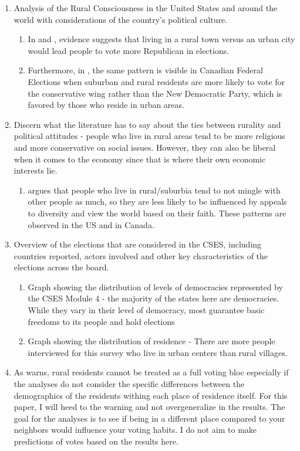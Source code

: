 \documentclass[12pt]{article}
\begin{document}
\begin{enumerate}
\begin{enumerate}
	\item Analysis of the Rural Consciousness in the United States and around the world with considerations of the country's political culture.
	\begin{enumerate}
		\item In \cite{walsh_putting_2012} and \cite{gimpel_rural_2006}, evidence suggests that living in a rural town versus an urban city would lead people to vote more Republican in elections.
		\item Furthermore, in \cite{walks_city-suburban_2005}, the same pattern is visible in Canadian Federal Elections when suburban and rural residents are more likely to vote for the conservative wing rather than the New Democratic Party, which is favored by those who reside in urban areas.
	\end{enumerate}
	\item Discern what the literature has to say about the ties between rurality and political attitudes - people who live in rural areas tend to be more religious and more conservative on social issues. However, they can also be liberal when it comes to the economy since that is where their own economic interests lie.
	\begin{enumerate}
		\item \cite{williamson_sprawl_2008} argues that people who live in rural/suburbia tend to not mingle with other people as much, so they are less likely to be influenced by appeals to diversity and view the world based on their faith. These patterns are observed in the US and in Canada.
	\end{enumerate}
	\item Overview of the elections that are considered in the CSES, including countries reported, actors involved and other key characteristics of the elections across the board. 
	\begin{enumerate}
		\item Graph showing the distribution of levels of democracies represented by the CSES Module 4 - the majority of the states here are democracies. While they vary in their level of democracy, most guarantee basic freedoms to its people and hold elections
		\item Graph showing the distribution of residence - There are more people interviewed for this survey who live in urban centers than rural villages.
	\end{enumerate}
	\item As \cite{holloway_burning_2007} warns, rural residents cannot be treated as a full voting bloc especially if the analyses do not consider the specific differences between the demographics of the residents withing each place of residence itself. For this paper, I will heed to the warning and not overgeneralize in the results. The goal for the analyses is to see if being in a different place compared to your neighbors would influence your voting habits. I do not aim to make predictions of votes based on the results here.

\end{enumerate}
\end{enumerate}
\end{document}
